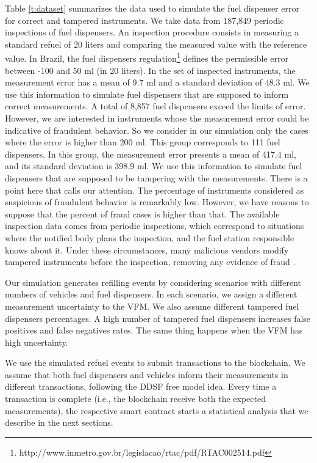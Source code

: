 \documentclass[sigplan]{acmart}
\begin{document}
Table \ref{t:dataset} summarizes the data used to simulate the fuel dispenser error for correct and tampered instruments.
We take data from 187,849 periodic inspections of fuel dispensers.
An inspection procedure consists in measuring a standard refuel of 20 liters and comparing the measured value with the reference value.
In Brazil, the fuel dispensers regulation\footnote{http://www.inmetro.gov.br/legislacao/rtac/pdf/RTAC002514.pdf} defines the permissible error between -100 and 50 ml (in 20 liters).
In the set of inspected instruments, the measurement error has a mean of 9.7 ml and a standard deviation of 48.3 ml.
We use this information to simulate fuel dispensers that are supposed to inform correct measurements.
A total of 8,857 fuel dispensers exceed the limits of error.
However, we are interested in instruments whose the measurement error could be indicative of fraudulent behavior.
So we consider in our simulation only the cases where the error is higher than 200 ml.
This group corresponds to 111 fuel dispensers.
In this group, the measurement error presents a mean of 417.4 ml, and its standard deviation is 398.9 ml.
We use this information to simulate fuel dispensers that are supposed to be tampering with the measurements.
There is a point here that calls our attention.
The percentage of instruments considered as suspicious of fraudulent behavior is remarkably low.
However, we have reasons to suppose that the percent of fraud cases is higher than that.
The available inspection data comes from periodic inspections, which correspond to situations where the notified body plans the inspection, and the fuel station responsible knows about it.
Under these circumstances, many malicious vendors modify tampered instruments before the inspection, removing any evidence of fraud \cite{Leitao2014a,Beteto2016}.

Our simulation generates refilling events by considering scenarios with different numbers of vehicles and fuel dispensers.
In each scenario, we assign a different measurement uncertainty to the VFM.
We also assume different tampered fuel dispensers percentages.
A high number of tampered fuel dispensers increases false positives and false negatives rates.
The same thing happens when the VFM has high uncertainty.

We use the simulated refuel events to submit transactions to the blockchain.
We assume that both fuel dispensers and vehicles inform their measurements in different transactions, following the DDSF free model idea.
Every time a transaction is complete (i.e., the blockchain receive both the expected measurements), the respective smart contract starts a statistical analysis that we describe in the next sections.
\end{document}
